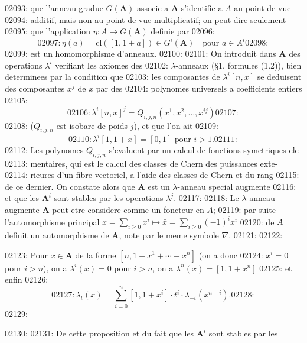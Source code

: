 02093: que l'anneau gradue $G(\mathbf{A})$ associe a $\mathbf{A}$ s'identifie a $A$ au point de vue
02094: additif, mais non au point de vue multiplicatif; on peut dire seulement
02095: que l'application $\eta: A \to G(\mathbf{A})$ definie par
02096: \begin{equation}
02097: \eta(a) = \mathrm{cl}([1, 1+a]) \in G^i(\mathbf{A}) \quad \text{pour } a \in A^i
02098: \end{equation}
02099: est un homomorphisme d'anneaux.
02100: 
02101: On introduit dans $\mathbf{A}$ des operations $\lambda^i$ verifiant les axiomes des
02102: $\lambda$-anneaux (\S 1, formules (1.2)), bien determinees par la condition que
02103: les composantes de $\lambda^i[n, x]$ se deduisent des composantes $x^j$ de $x$ par des
02104: polynomes universels a coefficients entiers
02105: \begin{equation}
02106: \lambda^i[n, x]^j = Q_{i,j,n}(x^1, x^2, \ldots, x^{ij})
02107: \end{equation}
02108: ($Q_{i,j,n}$ est isobare de poids $j$), et que l'on ait
02109: \begin{equation}
02110: \lambda^i[1, 1+x] = [0, 1] \text{ pour } i > 1.
02111: \end{equation}
02112: Les polynomes $Q_{i,j,n}$ s'evaluent par un calcul de fonctions symetriques ele-
02113: mentaires, qui est le calcul des classes de Chern des puissances exte-
02114: rieures d'un fibre vectoriel, a l'aide des classes de Chern et du rang
02115: de ce dernier. On constate alors que $\mathbf{A}$ est un $\lambda$-anneau special augmente
02116: et que les $\mathbf{A}^i$ sont stables par les operations $\lambda^j$.
02117: 
02118: Le $\lambda$-anneau augmente $\mathbf{A}$ peut etre considere comme un foncteur en $A$;
02119: par suite l'automorphisme principal $x = \sum_{i \geq 0} x^i \mapsto \bar{x} = \sum_{i \geq 0} (-1)^i x^i$
02120: de $A$ definit un automorphisme de $\mathbf{A}$, note par le meme symbole $\nabla$.
02121: 
02122: \begin{proposition}
02123: Pour $x \in \mathbf{A}$ de la forme $[n, 1 + x^1 + \cdots + x^n]$ (on a donc
02124: $x^i = 0$ pour $i > n$), on a $\lambda^i(x) = 0$ pour $i > n$, on a $\lambda^n(x) = [1, 1+x^n]$
02125: et enfin
02126: \begin{equation}
02127: \lambda_t(x) = \sum_{i=0}^{n} [1, 1+x^i] \cdot t^i \cdot \lambda_{-t}(\bar{x}^{n-i}).
02128: \end{equation}
02129: \end{proposition}
02130: 
02131: De cette proposition et du fait que les $\mathbf{A}^i$ sont stables par les
